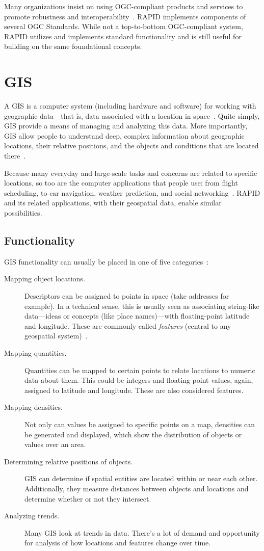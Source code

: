Many organizations insist on using OGC-compliant products and services to promote robustness and interoperability~\cite{Dunning2013,ogc}. RAPID implements components of several OGC Standards. While not a top-to-bottom OGC-compliant system, RAPID utilizes and implements standard functionality and is still useful for building on the same foundational concepts.

\section{GIS}
A GIS is a computer system (including hardware and software) for working with geographic data---that is, data associated with a location in space~\cite{Esriintro,gentle_intro}. Quite simply, GIS provide a means of managing and analyzing this data. More importantly, GIS allow people to understand deep, complex information about geographic locations, their relative positions, and the objects and conditions that are located there~\cite{Esriintro,gentle_intro}.

Because many everyday and large-scale tasks and concerns are related to specific locations, so too are the computer applications that people use: from flight scheduling, to car navigation, weather prediction, and social networking~\cite{Esriintro}. RAPID and its related applications, with their geospatial data, enable similar possibilities.

\subsection{Functionality}
GIS functionality can usually be placed in one of five categories~\cite{Esriintro}:

\begin{description}
  \item[Mapping object locations.] Descriptors can be assigned to points in space (take addresses for example). In a technical sense, this is usually seen as associating string-like data---ideas or concepts (like place names)---with floating-point latitude and longitude. These are commonly called \textit{features} (central to any geospatial system)~\cite{Kottman2009}.
  \item[Mapping quantities.] Quantities can be mapped to certain points to relate locations to numeric data about them. This could be integers and floating point values, again, assigned to latitude and longitude. These are also considered features.
  \item[Mapping densities.] Not only can values be assigned to specific points on a map, densities can be generated and displayed, which show the distribution of objects or values over an area.
  \item[Determining relative positions of objects.] GIS can determine if spatial entities are located within or near each other. Additionally, they measure distances between objects and locations and determine whether or not they intersect.
  \item[Analyzing trends.] Many GIS look at trends in data. There's a lot of demand and opportunity for analysis of how locations and features change over time.
\end{description}

